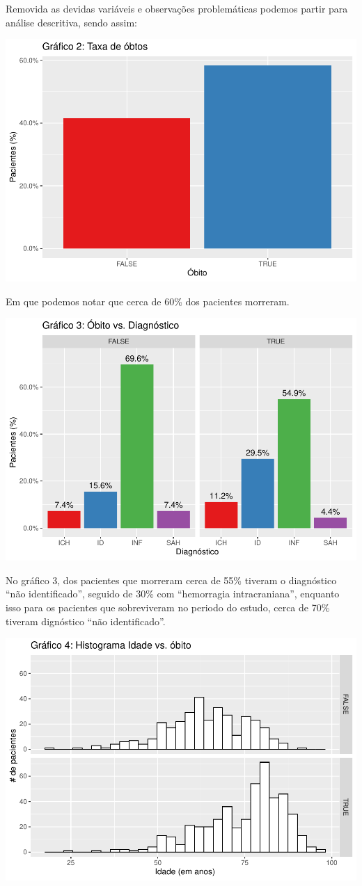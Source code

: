 \documentclass[]{article}
\begin{document}
Removida as devidas variáveis e observações problemáticas podemos partir
para análise descritiva, sendo assim:

\begin{center}\includegraphics[width=0.6\linewidth]{Atividade_3_files/figure-latex/unnamed-chunk-3-1} \end{center}

Em que podemos notar que cerca de 60\% dos pacientes morreram.

\begin{center}\includegraphics[width=0.7\linewidth]{Atividade_3_files/figure-latex/unnamed-chunk-4-1} \end{center}

No gráfico 3, dos pacientes que morreram cerca de 55\% tiveram o
diagnóstico ``não identificado'', seguido de 30\% com ``hemorragia
intracraniana'', enquanto isso para os pacientes que sobreviveram no
periodo do estudo, cerca de 70\% tiveram dignóstico ``não
identificado''.

\begin{center}\includegraphics[width=0.7\linewidth]{Atividade_3_files/figure-latex/unnamed-chunk-5-1} \end{center}
\end{document}

